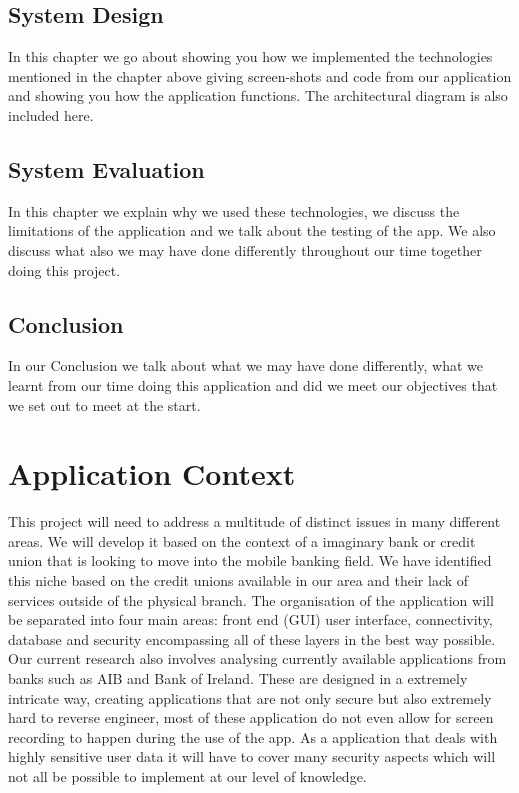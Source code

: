 \subsection{System Design}
In this chapter we go about showing you how we implemented the technologies mentioned in the chapter above giving screen-shots and code from our application and showing you how the application functions. The architectural diagram is also included here.

\subsection{System Evaluation}
In this chapter we explain why we used these technologies, we discuss the limitations of the application and we talk about the testing of the app. We also discuss what also we may have done differently throughout our time together doing this project.

\subsection{Conclusion}
In our Conclusion we talk about what we may have done differently, what we learnt from our time doing this application and did we meet our objectives that we set out to meet at the start.

\section{Application Context}
    This project will need to address a multitude of distinct issues in many different areas. We will develop it based on the context of a imaginary bank or credit union that is looking to move into the mobile banking field. We have identified this niche based on the credit unions available in our area and their lack of services outside of the physical branch.
    The organisation of the application will be separated into four main areas: front end (GUI) user interface, connectivity, database and security encompassing all of these layers in the best way possible.
    Our current research also involves analysing currently available applications from banks such as AIB and Bank of Ireland. These are designed in a extremely intricate way, creating applications that are not only secure but also extremely hard to reverse engineer, most of these application do not even allow for screen recording to happen during the use of the app.
    As a application that deals with highly sensitive user data it will have to cover many security aspects which will not all be possible to implement at our level of knowledge.

